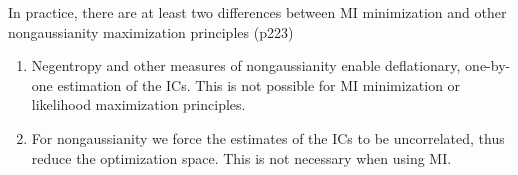 \documentclass[a4paper, one	side]{book}
\begin{document}
\noindent In practice, there are at least two differences between MI minimization and other nongaussianity maximization principles (p223)
\begin{enumerate}
\item Negentropy and other measures of nongaussianity enable deflationary, \ie one-by-one estimation of the ICs. This is not possible for MI minimization or likelihood maximization principles. 
\item For nongaussianity we force the estimates of the ICs to be uncorrelated, thus reduce the optimization space. This is not necessary when using MI. 
\end{enumerate}



























\printindex
\end{document}
